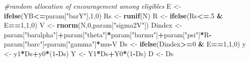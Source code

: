 \documentclass[]{book}
\newenvironment{Shaded}{\begin{snugshade}}{\end{snugshade}}
\newcommand{\KeywordTok}[1]{\textcolor[rgb]{0.13,0.29,0.53}{\textbf{#1}}}
\newcommand{\DecValTok}[1]{\textcolor[rgb]{0.00,0.00,0.81}{#1}}
\newcommand{\StringTok}[1]{\textcolor[rgb]{0.31,0.60,0.02}{#1}}
\newcommand{\CommentTok}[1]{\textcolor[rgb]{0.56,0.35,0.01}{\textit{#1}}}
\newcommand{\OperatorTok}[1]{\textcolor[rgb]{0.81,0.36,0.00}{\textbf{#1}}}
\newcommand{\NormalTok}[1]{#1}
\theoremstyle{definition}
\theoremstyle{definition}
\theoremstyle{definition}
\theoremstyle{remark}
\begin{document}
\begin{Shaded}
\begin{Highlighting}[]
\CommentTok{#random allocation of encouragement among eligibles}
\NormalTok{E <-}\StringTok{ }\KeywordTok{ifelse}\NormalTok{(YB}\OperatorTok{<=}\NormalTok{param[}\StringTok{"barY"}\NormalTok{],}\DecValTok{1}\NormalTok{,}\DecValTok{0}\NormalTok{)}
\NormalTok{Rs <-}\StringTok{ }\KeywordTok{runif}\NormalTok{(N)}
\NormalTok{R <-}\StringTok{ }\KeywordTok{ifelse}\NormalTok{(Rs}\OperatorTok{<=}\NormalTok{.}\DecValTok{5} \OperatorTok{&}\StringTok{ }\NormalTok{E}\OperatorTok{==}\DecValTok{1}\NormalTok{,}\DecValTok{1}\NormalTok{,}\DecValTok{0}\NormalTok{)}
\NormalTok{V <-}\StringTok{ }\KeywordTok{rnorm}\NormalTok{(N,}\DecValTok{0}\NormalTok{,param[}\StringTok{"sigma2V"}\NormalTok{])}
\NormalTok{Dindex <-}\StringTok{ }\NormalTok{param[}\StringTok{"baralpha"}\NormalTok{]}\OperatorTok{+}\NormalTok{param[}\StringTok{"theta"}\NormalTok{]}\OperatorTok{*}\NormalTok{param[}\StringTok{"barmu"}\NormalTok{]}\OperatorTok{+}\NormalTok{param[}\StringTok{"psi"}\NormalTok{]}\OperatorTok{*}\NormalTok{R}\OperatorTok{-}\NormalTok{param[}\StringTok{"barc"}\NormalTok{]}\OperatorTok{-}\NormalTok{param[}\StringTok{"gamma"}\NormalTok{]}\OperatorTok{*}\NormalTok{mu}\OperatorTok{-}\NormalTok{V}
\NormalTok{Ds <-}\StringTok{ }\KeywordTok{ifelse}\NormalTok{(Dindex}\OperatorTok{>=}\DecValTok{0} \OperatorTok{&}\StringTok{ }\NormalTok{E}\OperatorTok{==}\DecValTok{1}\NormalTok{,}\DecValTok{1}\NormalTok{,}\DecValTok{0}\NormalTok{)}
\NormalTok{y <-}\StringTok{ }\NormalTok{y1}\OperatorTok{*}\NormalTok{Ds}\OperatorTok{+}\NormalTok{y0}\OperatorTok{*}\NormalTok{(}\DecValTok{1}\OperatorTok{-}\NormalTok{Ds)}
\NormalTok{Y <-}\StringTok{ }\NormalTok{Y1}\OperatorTok{*}\NormalTok{Ds}\OperatorTok{+}\NormalTok{Y0}\OperatorTok{*}\NormalTok{(}\DecValTok{1}\OperatorTok{-}\NormalTok{Ds)}
\NormalTok{D <-}\StringTok{ }\NormalTok{Ds}


\end{Highlighting}
\end{Shaded}
\end{document}

